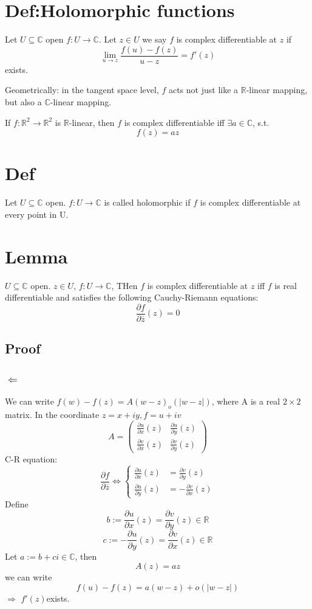 \documentclass{book}
\newcommand{\abs}[1]{\left\lvert #1 \right\rvert}
\begin{document}
\section{Def:Holomorphic functions}
Let $U\subseteq \mathbb C$ open $f:U\rightarrow \mathbb C$. Let $z\in U$ we say $f$ is complex differentiable at $z$ if$$\lim\limits_{u\rightarrow z}\frac{f(u)-f(z)}{u-z}=f'(z)$$exists.

Geometrically: in the tangent space level, $f$ acts not just like a $\mathbb R$-linear mapping, but also a $\mathbb C$-linear mapping.

If $f:\mathbb R^2\rightarrow\mathbb R^2$ is $\mathbb R$-linear, then $f$ is complex differentiable iff $\exists a\in \mathbb C$, s.t.$$f(z)=az$$
\section{Def}
Let $U\subseteq \mathbb C$ open. $f:U\rightarrow \mathbb C$ is called holomorphic if $f$ is complex differentiable at every point in U.
\section{Lemma}
$U\subseteq \mathbb C$ open. $z\in U$, $f:U\rightarrow \mathbb C$, THen $f$ is complex differentiable at $z$ iff $f$ is real differentiable and satisfies the following Cauchy-Riemann equations:$$\frac{\partial f}{\partial \overline z}(z)=0$$
\subsection*{Proof}
\subsubsection{$\Leftarrow$} We can write $f(w)-f(z)=A(w-z)_o(\abs{w-z})$, where A is a real $2\times 2$ matrix. In the coordinate $z=x+iy,f=u+iv$$$A=\begin{pmatrix}
    \frac{\partial u}{\partial x}(z)&\frac{\partial u}{\partial y}(z)\\
    \frac{\partial v}{\partial x}(z)&\frac{\partial v}{\partial y}(z)
\end{pmatrix}$$
C-R equation:
$$\frac{\partial f}{\partial \overline z}\Leftrightarrow\begin{cases}
    \frac{\partial u}{\partial x}(z)&=\frac{\partial v}{\partial y}(z)\\
    \frac{\partial u}{\partial y}(z)&=-\frac{\partial v}{\partial x}(z)
\end{cases}$$
Define $$b:=\frac{\partial u}{\partial x}(z)=\frac{\partial v}{\partial y}(z)\in \mathbb R$$
$$c:=-\frac{\partial u}{\partial y}(z)=\frac{\partial v}{\partial x}(z)\in \mathbb R$$
Let $a:=b+ci\in \mathbb C$, then $$A(z)=az$$we can write$$f(u)-f(z)=a(w-z)+o(\abs{w-z})$$$\Rightarrow$ $f'(z)$exists.
\end{document}
